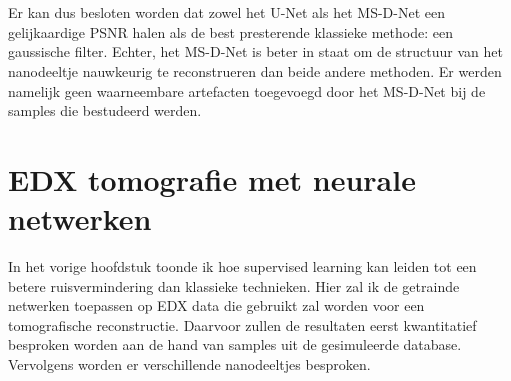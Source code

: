 \documentclass{report}
\begin{document}
\\ \\
Er kan dus besloten worden dat zowel het U-Net als het MS-D-Net een gelijkaardige PSNR halen als de best presterende klassieke methode: een gaussische filter. Echter, het MS-D-Net is beter in staat om de structuur van het nanodeeltje nauwkeurig te reconstrueren dan beide andere methoden. Er werden namelijk geen waarneembare artefacten toegevoegd door het MS-D-Net bij de samples die bestudeerd werden.


\chapter{EDX tomografie met neurale netwerken} \label{ch:exp}
In het vorige hoofdstuk toonde ik hoe supervised learning kan leiden tot een betere ruisvermindering dan klassieke technieken. Hier zal ik de getrainde netwerken toepassen op EDX data die gebruikt zal worden voor een tomografische reconstructie. Daarvoor zullen de resultaten eerst kwantitatief besproken worden aan de hand van samples uit de gesimuleerde database. Vervolgens worden er verschillende nanodeeltjes besproken.
\end{document}
